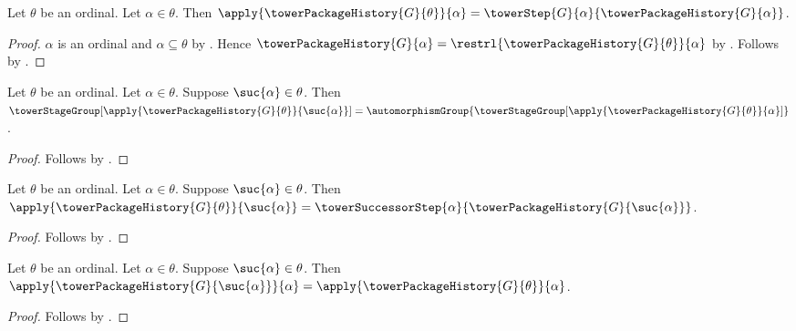 \begin{proposition}\label{tower_package_history_step}
    Let $\theta$ be an ordinal.
    Let $\alpha\in\theta$.
    Then $\apply{\towerPackageHistory{G}{\theta}}{\alpha}=
        \towerStep{G}{\alpha}{\towerPackageHistory{G}{\alpha}}$.
\end{proposition}
\begin{proof}
    $\alpha$ is an ordinal and $\alpha\subseteq\theta$ by
        .
    Hence $\towerPackageHistory{G}{\alpha}=
        \restrl{\towerPackageHistory{G}{\theta}}{\alpha}$ by
        .
    Follows by .
\end{proof}

\begin{proposition}\label{tower_package_history_successor_group}
    Let $\theta$ be an ordinal.
    Let $\alpha\in\theta$.
    Suppose $\suc{\alpha}\in\theta$.
    Then $\towerStageGroup[
            \apply{\towerPackageHistory{G}{\theta}}{\suc{\alpha}}]=
        \automorphismGroup{\towerStageGroup[
            \apply{\towerPackageHistory{G}{\theta}}{\alpha}]}$.
\end{proposition}
\begin{proof}
    Follows by
        .
\end{proof}

\begin{proposition}\label{tower_package_history_successor_value}
    Let $\theta$ be an ordinal.
    Let $\alpha\in\theta$.
    Suppose $\suc{\alpha}\in\theta$.
    Then $\apply{\towerPackageHistory{G}{\theta}}{\suc{\alpha}}=
        \towerSuccessorStep{\alpha}{
            \towerPackageHistory{G}{\suc{\alpha}}}$.
\end{proposition}
\begin{proof}
    Follows by
        .
\end{proof}

\begin{proposition}\label{tower_package_history_predecessor_value}
    Let $\theta$ be an ordinal.
    Let $\alpha\in\theta$.
    Suppose $\suc{\alpha}\in\theta$.
    Then $\apply{\towerPackageHistory{G}{\suc{\alpha}}}{\alpha}=
        \apply{\towerPackageHistory{G}{\theta}}{\alpha}$.
\end{proposition}
\begin{proof}
    Follows by
        .
\end{proof}

